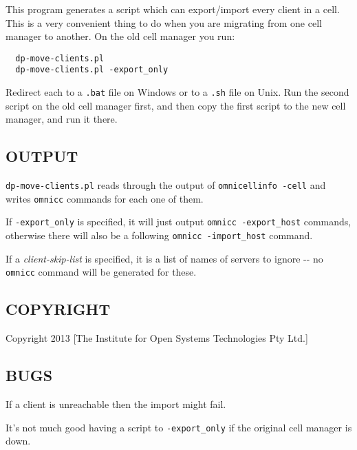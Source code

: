 \documentclass{article}
\begin{document}
This program generates a script which can export/import every client in a cell.
This is a very convenient thing to do when you are migrating from one cell manager to another. On
the old cell manager you run:

\begin{verbatim}
  dp-move-clients.pl
  dp-move-clients.pl -export_only
\end{verbatim}


Redirect each to a \texttt{.bat} file on Windows or to a \texttt{.sh} file on
Unix. Run the second script on the old cell manager first, and then
copy the first script to the new cell manager, and run it there.

\subsection*{OUTPUT\label{dp-move-clients_pl_OUTPUT}}


\texttt{dp-move-clients.pl} reads through the output of \texttt{omnicellinfo
-cell} and writes \texttt{omnicc} commands for each one of them.



If \texttt{-export\_only} is specified, it will just output \texttt{omnicc
-export\_host} commands, otherwise there will also be a following
\texttt{omnicc -import\_host} command.



If a \textit{client-skip-list} is specified, it is a list of names of
servers to ignore -{}- no \texttt{omnicc} command will be generated for these.

\subsection*{COPYRIGHT\label{dp-move-clients_pl_COPYRIGHT}}


Copyright 2013 [The Institute for Open Systems Technologies Pty Ltd.]

\subsection*{BUGS\label{dp-move-clients_pl_BUGS}}


If a client is unreachable then the import might fail.



It's not much good having a script to \texttt{-export\_only} if the original cell manager is down.
\end{document}
